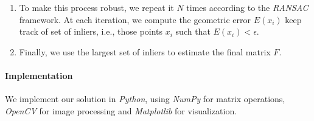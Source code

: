 \begin{enumerate}
\item To make this process robust, we repeat it $N$ times according to the \textit{RANSAC} framework. At each iteration, we compute the geometric error $E(x_i)$ keep track of set of inliers, i.e., those points $x_i$ such that $E(x_i) < \epsilon$.

\item Finally, we use the largest set of inliers to estimate the final matrix $F$.

\end{enumerate}

\paragraph{Implementation} We implement our solution in \textit{Python}, using \textit{NumPy} for matrix operations, \textit{OpenCV} for image processing and \textit{Matplotlib} for visualization.

